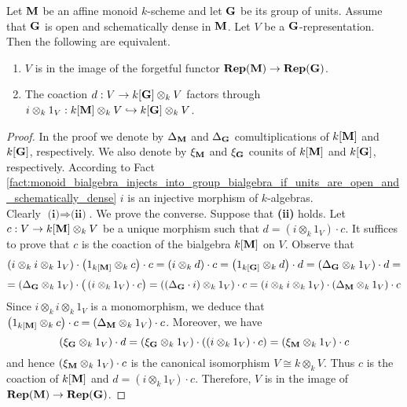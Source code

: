 \begin{theorem}\label{theorem:characterization_of_monoid_representations}
Let $\mathbf{M}$ be an affine monoid $k$-scheme and let $\mathbf{G}$ be its group of units. Assume that $\mathbf{G}$ is open and schematically dense in $\mathbf{M}$. Let $V$ be a $\mathbf{G}$-representation. Then the following are equivalent.
\begin{enumerate}[label=\emph{\textbf{(\roman*)}}, leftmargin=3.0em]
\item $V$ is in the image of the forgetful functor $\mathbf{Rep}(\mathbf{M}) \rightarrow \mathbf{Rep}(\mathbf{G})$.
\item The coaction $d:V \rightarrow k[\mathbf{G}]\otimes_kV$ factors through $i\otimes_k1_V:k[\mathbf{M}]\otimes_kV\hookrightarrow k[\mathbf{G}]\otimes_kV$.
\end{enumerate}
\end{theorem}
\begin{proof}
In the proof we denote by $\Delta_{\mathbf{M}}$ and $\Delta_{\mathbf{G}}$ comultiplications of $k[\mathbf{M}]$ and $k[\mathbf{G}]$, respectively. We also denote by $\xi_{\mathbf{M}}$ and $\xi_{\mathbf{G}}$ counits of $k[\mathbf{M}]$ and $k[\mathbf{G}]$, respectively. According to Fact \ref{fact:monoid_bialgebra_injects_into_group_bialgebra_if_units_are_open_and_schematically_dense} $i$ is an injective morphism of $k$-algebras.\\
Clearly $\textbf{(i)}\Rightarrow \textbf{(ii)}$. We prove the converse. Suppose that \textbf{(ii)} holds. Let $c:V\rightarrow k[\mathbf{M}]\otimes_kV$ be a unique morphism such that $d = (i\otimes_k1_V) \cdot c$. It suffices to prove that $c$ is the coaction of the bialgebra $k[\mathbf{M}]$ on $V$. Observe that
$$\left(i\otimes_k i \otimes_k 1_V\right)\cdot \left(1_{k[\mathbf{M}]} \otimes_k c\right)\cdot c = \left(i\otimes_k d \right)\cdot c = \left(1_{k[\mathbf{G}]}\otimes_k d\right)\cdot d = \left(\Delta_{\mathbf{G}}\otimes_k1_V\right) \cdot d =$$
$$=\left(\Delta_{\mathbf{G}}\otimes_k1_V\right) \cdot \big(\left(i\otimes_k 1_V\right) \cdot c\big) = \left((\Delta_{\mathbf{G}}\cdot i )\otimes_k1_V\right) \cdot c = \left(i \otimes_k i \otimes_k 1_V\right) \cdot \left(\Delta_{\mathbf{M}}\otimes_k 1_V\right)\cdot c$$
Since $i\otimes_k i \otimes_k 1_V$ is a monomorphism, we deduce that $\left(1_{k[\mathbf{M}]} \otimes_k c\right)\cdot c =  \left(\Delta_{\mathbf{M}}\otimes_k 1_V\right)\cdot c$. Moreover, we have
$$(\xi_{\mathbf{G}}\otimes_k 1_V)\cdot d = (\xi_{\mathbf{G}}\otimes_k 1_V)\cdot \left((i \otimes_k 1_V) \cdot c\right) = (\xi_{\mathbf{M}}\otimes_k1_V)\cdot c$$
and hence $(\xi_{\mathbf{M}}\otimes_k1_V)\cdot c$ is the canonical isomorphism $V\cong k\otimes_kV$. Thus $c$ is the coaction of $k[\mathbf{M}]$ and $d = (i\otimes_k1_V) \cdot c$. Therefore, $V$ is in the image of $\mathbf{Rep}(\mathbf{M})\rightarrow \mathbf{Rep}(\mathbf{G})$.
\end{proof}

